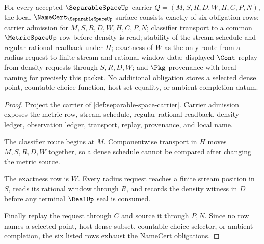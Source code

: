 \begin{theorem}
\label{thm:separable-space-namecert-obligations}
For every accepted $\SeparableSpaceUp$ carrier
$Q=(M,S,R,D,W,H,C,P,N)$, the local
$\NameCert_{\SeparableSpaceUp}$ surface consists exactly of six obligation
rows: carrier admission for $M,S,R,D,W,H,C,P,N$; classifier transport to a
common $\MetricSpaceUp$ row before density is read; stability of the stream
schedule and regular rational readback under $H$; exactness of $W$ as the
only route from a radius request to finite stream and rational-window data;
displayed $\Cont$ replay from density requests through $S,R,D,W$; and $\Pkg$
provenance with local naming for precisely this packet. No additional
obligation stores a selected dense point, countable-choice function, host set
equality, or ambient completion datum.
\end{theorem}
\begin{proof}
Project the carrier of \autoref{def:separable-space-carrier}. Carrier
admission exposes the metric row, stream schedule, regular rational readback,
density ledger, observation ledger, transport, replay, provenance, and local
name.

The classifier route begins at $M$. Componentwise transport in $H$ moves
$M,S,R,D,W$ together, so a dense schedule cannot be compared after changing
the metric source.

The exactness row is $W$. Every radius request reaches a finite stream
position in $S$, reads its rational window through $R$, and records the
density witness in $D$ before any terminal $\RealUp$ seal is consumed.

Finally replay the request through $C$ and source it through $P,N$. Since no
row names a selected point, host dense subset, countable-choice selector, or
ambient completion, the six listed rows exhaust the NameCert obligations.
\end{proof}

